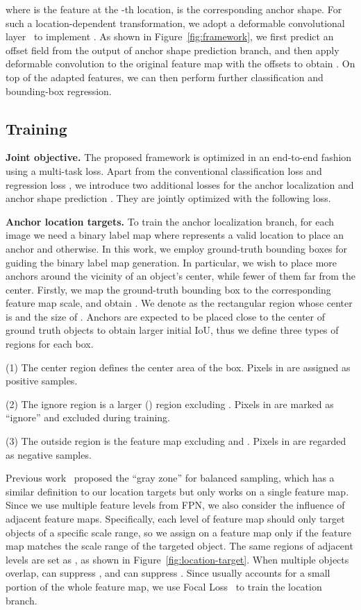 \documentclass[10pt,twocolumn,letterpaper]{article}
\begin{document}
where  is the feature at the -th location,  is the
corresponding anchor shape.
For such a location-dependent transformation, we adopt a
 deformable convolutional layer~\cite{dai16rfcn} to implement .
As shown in Figure~\ref{fig:framework}, we first predict an offset
field from the output of anchor shape prediction branch, and then apply
deformable convolution to the original feature map with the offsets to
obtain .
On top of the adapted features, we can then perform further
classification and bounding-box regression.

\subsection{Training}

\noindent
\textbf{Joint objective.}
The proposed framework is optimized in an end-to-end fashion using a multi-task loss.
Apart from the conventional classification loss  and regression loss ,
we introduce two additional losses for the anchor localization  and
anchor shape prediction .
They are jointly optimized with the following loss.




\noindent
\textbf{Anchor location targets.}
To train the anchor localization branch, for each image we need a binary label map where  represents a valid location to place an anchor and  otherwise.
In this work, we employ ground-truth bounding boxes for guiding the binary label map generation.
In particular, we wish to place more anchors around the vicinity of an object's center, while fewer of them far from the center.
Firstly, we map the ground-truth bounding box  to the
corresponding feature map scale, and obtain .
We denote  as the rectangular region whose center is
 and the size of .
Anchors are expected to be placed close to the center of ground truth objects to obtain larger initial IoU, thus we define three types of regions for each box.

\noindent
(1) The center region 
defines the center area of the box. Pixels in  are assigned as positive samples.


\noindent
(2) The ignore region 
is a larger () region excluding . Pixels in  are marked as ``ignore'' and excluded during training.


\noindent
(3) The outside region  is the feature map excluding  and .
Pixels in  are regarded as negative samples.


Previous work~\cite{huang2015densebox} proposed the ``gray zone'' for balanced sampling,
which has a similar definition to our location targets but only works on a single feature map.
Since we use multiple feature levels from FPN, we also consider the influence
of adjacent feature maps.
Specifically, each level of feature map should only target objects of a specific scale range,
so we assign  on a feature map only if the feature map matches the scale
range of the targeted object.
The same regions of adjacent levels are set as , as shown in Figure~\ref{fig:location-target}.
When multiple objects overlap,  can suppress , and  can suppress .
Since  usually accounts for a small portion of the whole feature map, we use Focal Loss~\cite{lin2017focal} to train the location branch.
\end{document}
